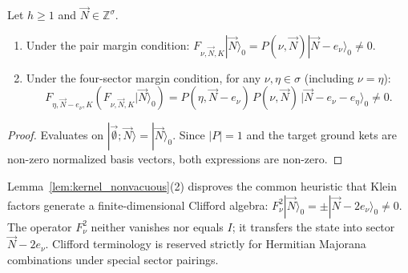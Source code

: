 \begin{lemma}
\label{lem:kernel_nonvacuous}
Let $h \ge 1$ and $\vec{N} \in \mathbb{Z}^\sigma$.
\begin{enumerate}
    \item Under the pair margin condition: $F_{\nu, \vec{N}, K} |\vec{N}\rangle_0 = P(\nu, \vec{N}) |\vec{N}-e_\nu\rangle_0 \neq 0$.
    \item Under the four-sector margin condition, for any $\nu, \eta \in \sigma$ (including $\nu = \eta$):
    \begin{equation}
    F_{\eta, \vec{N}-e_\nu, K} \left( F_{\nu, \vec{N}, K} |\vec{N}\rangle_0 \right) = P(\eta, \vec{N}-e_\nu)\, P(\nu, \vec{N})\, |\vec{N}-e_\nu-e_\eta\rangle_0 \neq 0.
    \end{equation}
\end{enumerate}
\end{lemma}

\begin{proof}
Evaluates on $|\vec{\emptyset}; \vec{N}\rangle = |\vec{N}\rangle_0$. Since $|P| = 1$ and the target ground kets are non-zero normalized basis vectors, both expressions are non-zero.
\end{proof}

\begin{remark}
Lemma~\ref{lem:kernel_nonvacuous}(2) disproves the common heuristic that Klein factors generate a finite-dimensional Clifford algebra: $F_\nu^2 |\vec{N}\rangle_0 = \pm |\vec{N}-2e_\nu\rangle_0 \neq 0$. The operator $F_\nu^2$ neither vanishes nor equals $I$; it transfers the state into sector $\vec{N}-2e_\nu$. Clifford terminology is reserved strictly for Hermitian Majorana combinations under special sector pairings.
\end{remark}

